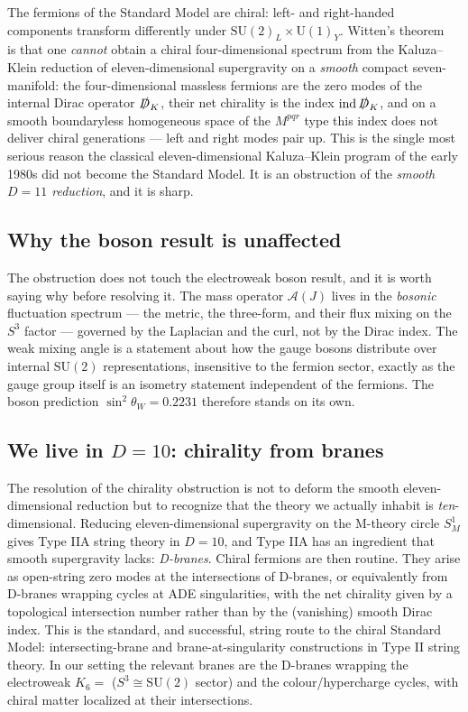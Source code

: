 \documentclass[11pt]{article}
\theoremstyle{plain}
\theoremstyle{definition}
\newcommand{\cA}{\mathcal{A}}
\newcommand{\sinsq}{\sin^{2}\theta_W}
\newcommand{\SU}{\mathrm{SU}}
\newcommand{\U}{\mathrm{U}}
\begin{document}
The fermions of the Standard Model are chiral: left- and right-handed
components transform differently under $\SU(2)_L\times\U(1)_Y$. Witten's
theorem~\cite{Witten1981} is that one \emph{cannot} obtain a chiral
four-dimensional spectrum from the Kaluza--Klein reduction of eleven-dimensional
supergravity on a \emph{smooth} compact seven-manifold: the four-dimensional
massless fermions are the zero modes of the internal Dirac operator
$\slashed D_K$, their net chirality is the index $\mathrm{ind}\,\slashed D_K$,
and on a smooth boundaryless homogeneous space of the $M^{pqr}$ type this
index does not deliver chiral generations --- left and right modes pair up.
This is the single most serious reason the classical eleven-dimensional
Kaluza--Klein program of the early 1980s did not become the Standard Model. It
is an obstruction of the \emph{smooth $D=11$ reduction}, and it is sharp.

\subsection{Why the boson result is unaffected}

The obstruction does not touch the electroweak boson result, and it is worth
saying why before resolving it. The mass operator $\cA(J)$ lives in the
\emph{bosonic} fluctuation spectrum --- the metric, the three-form, and their
flux mixing on the $S^3$ factor --- governed by the Laplacian and the curl,
not by the Dirac index. The weak mixing angle is a statement about how the
gauge bosons distribute over internal $\SU(2)$ representations, insensitive to
the fermion sector, exactly as the gauge group itself is an isometry statement
independent of the fermions. The boson prediction $\sinsq=0.2231$ therefore
stands on its own.

\subsection{We live in $D=10$: chirality from branes}

The resolution of the chirality obstruction is not to deform the smooth
eleven-dimensional reduction but to recognize that the theory we actually
inhabit is \emph{ten}-dimensional. Reducing eleven-dimensional supergravity on
the M-theory circle $S^1_M$ gives Type IIA string theory in $D=10$, and Type
IIA has an ingredient that smooth supergravity lacks: \emph{D-branes}. Chiral
fermions are then routine. They arise as open-string zero modes at the
intersections of D-branes, or equivalently from D-branes wrapping cycles at
ADE singularities, with the net chirality given by a topological
intersection number rather than by the (vanishing) smooth Dirac index. This is
the standard, and successful, string route to the chiral Standard Model:
intersecting-brane and brane-at-singularity constructions in Type II string
theory. In our setting the relevant branes are the D-branes wrapping the
electroweak $K_6=$ ($S^3\cong\SU(2)$ sector) and the colour/hypercharge
cycles, with chiral matter localized at their intersections.
\end{document}
